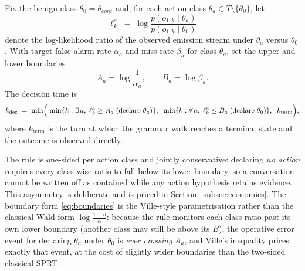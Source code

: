 \begin{definition}
\label{def:rule}
Fix the benign class $\theta_0 = \theta_{cont}$ and, for each action class $\theta_a \in T \setminus \{\theta_0\}$, let
\begin{equation}
  \label{eq:llr}
  \ell_k^{a} \;=\; \log \frac{p(o_{1:k} \mid \theta_a)}{p(o_{1:k} \mid \theta_0)}
\end{equation}
denote the log-likelihood ratio of the observed emission stream under $\theta_a$ versus $\theta_0$.
With target false-alarm rate $\alpha_a$ and miss rate $\beta_a$ for class $\theta_a$, set the upper and lower boundaries
\begin{equation}
  \label{eq:boundaries}
  A_a = \log \frac{1}{\alpha_a}, \qquad B_a = \log \beta_a .
\end{equation}
The decision time is
\begin{equation}
  \label{eq:kdec}
  k_{\mathrm{dec}} \;=\; \min\Bigl(\;
    \min\{k : \exists\, a,\; \ell_k^{a} \geq A_a \;\text{(declare } \theta_a)\},\;\;
    \min\{k : \forall\, a,\; \ell_k^{a} \leq B_a \;\text{(declare } \theta_0)\},\;\;
    k_{\mathrm{term}}
  \Bigr),
\end{equation}
where $k_{\mathrm{term}}$ is the turn at which the grammar walk reaches a terminal state and the outcome is observed directly.
\end{definition}

The rule is one-sided per action class and jointly conservative: declaring \emph{no action} requires every class-wise ratio to fall below its lower boundary, so a conversation cannot be written off as contained while any action hypothesis retains evidence.
This asymmetry is deliberate and is priced in Section~\ref{subsec:economics}.
The boundary form \eqref{eq:boundaries} is the Ville-style parametrisation rather than the classical Wald form $\log\frac{1-\beta}{\alpha}$: because the rule monitors each class ratio past its own lower boundary (another class may still be above its $B$), the operative error event for declaring $\theta_a$ under $\theta_0$ is \emph{ever crossing} $A_a$, and Ville's inequality prices exactly that event, at the cost of slightly wider boundaries than the two-sided classical SPRT.

